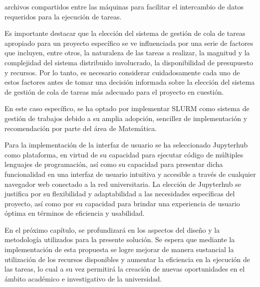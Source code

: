 \begin{spacing}{1.5}
\begin{itemize}
          archivos compartidos entre las máquinas para facilitar el intercambio de datos
          requeridos para la ejecución de tareas.
  \end{itemize}
  Es importante destacar que la elección del sistema de gestión de cola de
  tareas apropiado para un proyecto específico se ve influenciada por una serie
  de factores que incluyen, entre otros, la naturaleza de las tareas a realizar,
  la magnitud y la complejidad del sistema distribuido involucrado, la
  disponibilidad de presupuesto y recursos. Por lo tanto, es necesario considerar
  cuidadosamente cada uno de estos factores antes de tomar una decisión informada
  sobre la elección del sistema de gestión de cola de tareas más adecuado para el
  proyecto en cuestión.

  En este caso específico, se ha optado por implementar SLURM como sistema de
  gestión de trabajos debido a su amplia adopción, sencillez de implementación y
  recomendación por parte del área de Matemática.

  Para la implementación de la interfaz de usuario se ha seleccionado
  Jupyterhub como plataforma, en virtud de su capacidad para ejecutar código de
  múltiples lenguajes de programación, así como su capacidad para presentar dicha
  funcionalidad en una interfaz de usuario intuitiva y accesible a través de
  cualquier navegador web conectado a la red universitaria. La elección de
  Jupyterhub se justifica por su flexibilidad y adaptabilidad a las necesidades
  específicas del proyecto, así como por su capacidad para brindar una
  experiencia de usuario óptima en términos de eficiencia y usabilidad.

  En el próximo capítulo, se profundizará en los aspectos del diseño y la
  metodología utilizados para la presente solución. Se espera que mediante la
  implementación de esta propuesta se logre mejorar de manera sustancial la
  utilización de los recursos disponibles y aumentar la eficiencia en la
  ejecución de las tareas, lo cual a su vez permitirá la creación de nuevas
  oportunidades en el ámbito académico e investigativo de la universidad.

  \mylinespacing
  \mylinespacing
  \begin{tightcenter}
  \end{tightcenter}
\end{spacing}